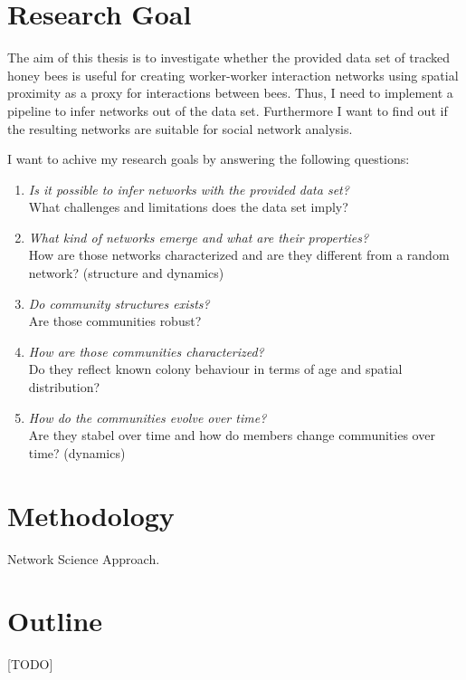 \section{Research Goal}

The aim of this thesis is to investigate whether the provided data set of tracked honey bees is useful for creating worker-worker interaction networks using spatial proximity as a proxy for interactions between bees. Thus, I need to implement a pipeline to infer networks out of the data set. Furthermore I want to find out if the resulting networks are suitable for social network analysis.

I want to achive my research goals by answering the following questions:

\begin{enumerate}
\item \emph{Is it possible to infer networks with the provided data set?}\\
What challenges and limitations does the data set imply?
\item \emph{What kind of networks emerge and what are their properties?}\\
How are those networks characterized and are they different from a random network? (structure and dynamics)
\item \emph{Do community structures exists?}\\
Are those communities robust?
\item \emph{How are those communities characterized?}\\
Do they reflect known colony behaviour in terms of age and spatial distribution?
\item \emph{How do the communities evolve over time?}\\
Are they stabel over time and how do members change communities over time? (dynamics)

\end{enumerate}


\section{Methodology}

Network Science Approach.

\section{Outline}
[TODO]